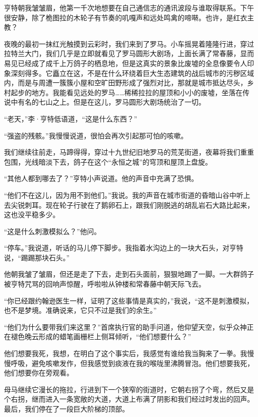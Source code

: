 \documentclass[AutoFakeBold=true]{book}
\begin{document}
亨特朝我皱皱眉，他第一千次地想要在自己通信志的通讯波段与谁取得联系。下午很安静，除了桅图拉的木轮子有节奏的叽嘎声和远处鸣禽的啼啭。也许，是红衣主教？

\vspace*{1em}

夜晚的最初一抹红光触摸到云彩时，我们来到了罗马。小车摇晃着隆隆行进，穿过拉特兰大门，我们几乎是立即就看见了罗马圆形大剧场，上面长满了常春藤，显而易见已经成了成千上万鸽子的栖息地，但是这真实的景象比废墟的全息像要令人印象深刻得多。它矗立在这，不是在什么环绕着巨大生态建筑的战后城市的污秽区域内，而是与周遭一簇簇小屋和空旷田野形成了强烈对比，那就是城市抵达尽头，乡村起步的地方。我能看见远处的罗马……稀稀拉拉的屋顶和小小的废墟，坐落在传说中有名的七山之上。但是在这儿，罗马圆形大剧场统治了一切。

``老天，''李·亨特低语道，``这是什么东西？''

``强盗的残骸。''我慢慢说道，很怕会再次引起那可怕的咳嗽。

我们继续往前走，马蹄得得，穿过十九世纪旧地罗马的荒芜街道，夜幕将我们重重包围，光线暗淡下去，鸽子在这个``永恒之城''的穹顶和屋顶上盘旋。

``其他人都到哪去了？''亨特小声说道。他的声音中充满了恐惧。

``他们不在这儿，因为用不到他们。''我说。我的声音在城市街道的昏暗山谷中听上去尖锐刺耳。现在轮子行驶在了鹅卵石上，跟我们刚脱逃的胡乱岩石大路比起来，这也没平稳多少。

``这是什么刺激模拟么？''他问。

``停车。''我说道，听话的马儿停下脚步。我指着水沟边上的一块大石头，对亨特说，``踢踢那块石头。''

他朝我皱了皱眉，但还是走了下去，走到石头面前，狠狠地踢了一脚。一大群鸽子被亨特咒骂的回响声惊醒，呼啦啦从钟楼和常春藤中朝天际飞去。

``你已经跟约翰逊医生一样，证明了这些事情是真实的，''我说，``这不是刺激模拟，也不是梦境。准确说来，它只不过是我们的余生。''

``他们为什么要带我们来这里？''首席执行官的助手问道，他仰望天空，似乎众神正在褪色晚云形成的蜡笔画栅栏上侧耳倾听，``他们想要什么？''

{\kaishu 他们想要我死，}我想，在明白了这个事实后，我感觉有谁给我当胸来了一拳。我慢慢呼吸，避免咳嗽发作，但我感觉到痰液在我的喉咙里沸腾冒泡。{\kaishu 他们想要我死，他们想要你在旁观看。}

母马继续它漫长的拖拉，行进到下一个狭窄的街道时，它朝右拐了个弯，然后又是个右拐，继而进入一条宽敞的大道，大道上布满了阴影和我们经过时发出的回声。最后，我们停在了一段巨大阶梯的顶部。
\end{document}
